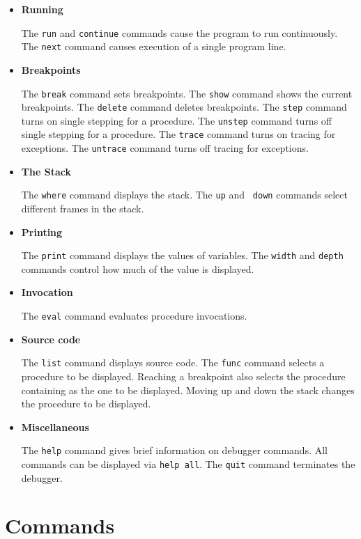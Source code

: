 \begin{itemize}

\item{\bf Running}
  
  The {\tt run} and {\tt continue} commands cause the program to run
  continuously.  The {\tt next} command causes execution of a single
  program line.
  
\item{\bf Breakpoints}
  
  The {\tt break} command sets breakpoints.  The {\tt show} command
  shows the current breakpoints.  The {\tt delete} command deletes
  breakpoints.  The {\tt step} command turns on single stepping for a
  procedure.  The {\tt unstep} command turns off single stepping for a
  procedure.  The {\tt trace} command turns on tracing for exceptions.
  The {\tt untrace} command turns off tracing for exceptions.
  
\item{\bf The Stack}
  
  The {\tt where} command displays the stack.  The {\tt up} and {\tt
  down} commands select different frames in the stack.
  
\item{\bf Printing}
  
  The {\tt print} command displays the values of variables.  The
  {\tt width} and {\tt depth} commands control how much of the value
  is displayed.
  
\item{\bf Invocation}
  
  The {\tt eval} command evaluates procedure invocations.
  
\item{\bf Source code}
  
  The {\tt list} command displays source code.  The {\tt func}
  command selects a procedure to be displayed.  Reaching a breakpoint
  also selects the procedure containing as the one to be displayed.
  Moving up and down the stack changes the procedure to be displayed.
  
\item{\bf Miscellaneous}
  
  The {\tt help} command gives brief information on debugger
  commands.  All commands can be displayed via {\tt help all}.  The
  {\tt quit} command terminates the debugger.

\end{itemize}

\section{Commands}

